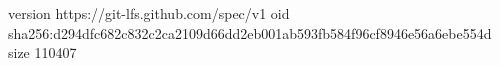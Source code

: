 version https://git-lfs.github.com/spec/v1
oid sha256:d294dfc682c832c2ca2109d66dd2eb001ab593fb584f96cf8946e56a6ebe554d
size 110407
